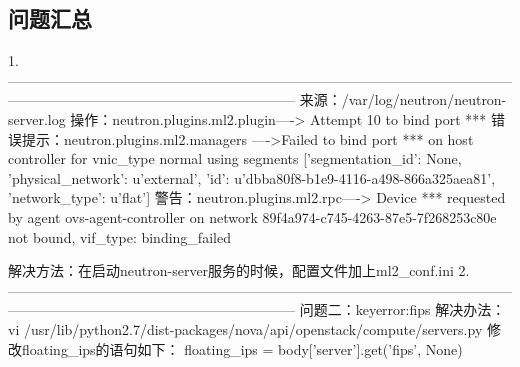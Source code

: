 \documentclass[a4paper,left=1.5cm,right=1.5cm,11pt]{article}
\begin{document}
\tableofcontents

\clearpage

\subsection{问题汇总}
1.--------------------------------------------------------------------------------------------------------------------------------------------------------------------------
	来源：/var/log/neutron/neutron-server.log
	操作：neutron.plugins.ml2.plugin----> Attempt 10 to bind port ***
	错误提示：neutron.plugins.ml2.managers ---->Failed to bind port *** on host controller for vnic_type normal using segments
	[{'segmentation_id': None, 'physical_network': u'external', 'id': u'dbba80f8-b1e9-4116-a498-866a325aea81', 'network_type': u'flat'}]
	警告：neutron.plugins.ml2.rpc----> Device *** requested by agent ovs-agent-controller on network 89f4a974-c745-4263-87e5-7f268253c80e not bound, vif_type: binding_failed

	解决方法：在启动neutron-server服务的时候，配置文件加上ml2_conf.ini
2.--------------------------------------------------------------------------------------------------------------------------------------------------------------------------
	问题二：keyerror:fips
	解决办法：vi /usr/lib/python2.7/dist-packages/nova/api/openstack/compute/servers.py
	修改floating_ips的语句如下：
	floating_ips = body['server'].get('fips', None)
\end{document}
